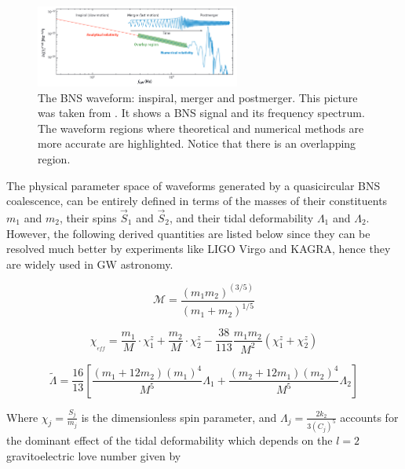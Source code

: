 \begin{figure}[hbt!]
\begin{center}
\includegraphics[width=0.6\textwidth, angle=0]{images/postmerger.png}
\captionsetup{width=0.8\textwidth}
\caption[The BNS waveform: inspiral, merger and postmerger]{The BNS waveform: inspiral, merger and postmerger. This picture was taken from \cite{Radice_2020}. It shows a BNS signal and its frequency spectrum. The waveform regions where theoretical and numerical methods are more accurate are highlighted. Notice that there is an overlapping region.}
\label{BBH and BNS2}
\end{center}
\end{figure}

\FloatBarrier

The physical parameter space of waveforms generated by a quasicircular BNS coalescence, can be entirely defined in terms of the masses of their constituents $m_1$ and $m_2$, their spins $\vec{S}_1$ and $\vec{S}_2$, and their tidal deformability $\Lambda_1$ and $\Lambda_2$\cite{Hinderer:2009ca}. However, the following derived quantities are listed below since they can be resolved much better by experiments like LIGO Virgo and KAGRA, hence they are widely used in GW astronomy.

\begin{equation}
\mathcal{M} = \frac{(m_1 m_2)^{(3/5)}}{(m_1 + m_2)^{1/5}}
\end{equation}

\begin{equation}\label{chieff}
\chi_{_{eff}} = \frac{m_1}{M}\cdot \chi_1^z + \frac{m_2}{M}\cdot \chi_2^z - \frac{38}{113} \frac{m_1 m_2}{M^2}(\chi_1^z + \chi_2^z)
\end{equation}


\begin{equation}
\tilde{\Lambda} = \frac{16}{13} \left[ \frac{(m_1 +12m_2)(m_1)^4}{M^5} \Lambda_1 + \frac{(m_2 +12m_1)(m_2)^4}{M^5} \Lambda_2 \right]
\end{equation}

Where $\chi_j = \frac{S_j}{m_j}$ is the dimensionless spin parameter, and $\Lambda_j = \frac{2k_2}{3(C_j)^5}$ accounts for the dominant effect of the tidal deformability  which depends on the $l=2$ gravitoelectric love number given by

